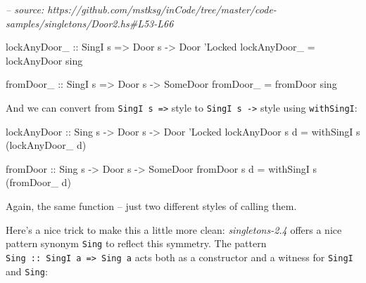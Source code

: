 \documentclass[]{article}
\newenvironment{Shaded}{}{}
\newcommand{\CommentTok}[1]{\textcolor[rgb]{0.38,0.63,0.69}{\textit{#1}}}
\newcommand{\DataTypeTok}[1]{\textcolor[rgb]{0.56,0.13,0.00}{#1}}
\newcommand{\FunctionTok}[1]{\textcolor[rgb]{0.02,0.16,0.49}{#1}}
\newcommand{\NormalTok}[1]{#1}
\newcommand{\OtherTok}[1]{\textcolor[rgb]{0.00,0.44,0.13}{#1}}
\begin{document}
\begin{Shaded}
\begin{Highlighting}[]
\CommentTok{-- source: https://github.com/mstksg/inCode/tree/master/code-samples/singletons/Door2.hs#L53-L66}

\OtherTok{lockAnyDoor_ ::} \DataTypeTok{SingI}\NormalTok{ s }\OtherTok{=>} \DataTypeTok{Door}\NormalTok{ s }\OtherTok{->} \DataTypeTok{Door}\NormalTok{ '}\DataTypeTok{Locked}
\NormalTok{lockAnyDoor_ }\FunctionTok{=}\NormalTok{ lockAnyDoor sing}

\OtherTok{fromDoor_ ::} \DataTypeTok{SingI}\NormalTok{ s }\OtherTok{=>} \DataTypeTok{Door}\NormalTok{ s }\OtherTok{->} \DataTypeTok{SomeDoor}
\NormalTok{fromDoor_ }\FunctionTok{=}\NormalTok{ fromDoor sing}
\end{Highlighting}
\end{Shaded}

And we can convert from \texttt{SingI\ s\ =\textgreater{}} style to
\texttt{SingI\ s\ -\textgreater{}} style using \texttt{withSingI}:

\begin{Shaded}
\begin{Highlighting}[]
\OtherTok{lockAnyDoor ::} \DataTypeTok{Sing}\NormalTok{ s }\OtherTok{->} \DataTypeTok{Door}\NormalTok{ s }\OtherTok{->} \DataTypeTok{Door}\NormalTok{ '}\DataTypeTok{Locked}
\NormalTok{lockAnyDoor s d }\FunctionTok{=}\NormalTok{ withSingI s (lockAnyDoor_ d)}

\OtherTok{fromDoor ::} \DataTypeTok{Sing}\NormalTok{ s }\OtherTok{->} \DataTypeTok{Door}\NormalTok{ s }\OtherTok{->} \DataTypeTok{SomeDoor}
\NormalTok{fromDoor s d }\FunctionTok{=}\NormalTok{ withSingI s (fromDoor_ d)}
\end{Highlighting}
\end{Shaded}

Again, the same function -- just two different styles of calling them.

Here's a nice trick to make this a little more clean: \emph{singletons-2.4}
offers a nice pattern synonym \texttt{Sing} to reflect this symmetry. The
pattern \texttt{Sing\ ::\ SingI\ a\ =\textgreater{}\ Sing\ a} acts both as a
constructor and a witness for \texttt{SingI} and \texttt{Sing}:
\end{document}
